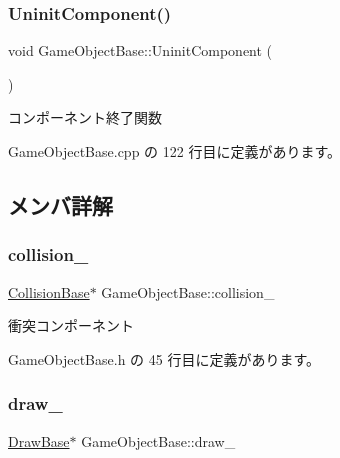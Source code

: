 \subsubsection{\texorpdfstring{Uninit\+Component()}{UninitComponent()}}
{\footnotesize\ttfamily void Game\+Object\+Base\+::\+Uninit\+Component (\begin{DoxyParamCaption}{ }\end{DoxyParamCaption})\hspace{0.3cm}{\ttfamily [private]}}



コンポーネント終了関数 



 Game\+Object\+Base.\+cpp の 122 行目に定義があります。



\subsection{メンバ詳解}
\mbox{\label{class_game_object_base_a63c44924e1e0c90461d191fdb11f33b0}} 
\subsubsection{\texorpdfstring{collision\+\_\+}{collision\_}}
{\footnotesize\ttfamily \mbox{\hyperlink{class_collision_base}{Collision\+Base}}$\ast$ Game\+Object\+Base\+::collision\+\_\+\hspace{0.3cm}{\ttfamily [private]}}



衝突コンポーネント 



 Game\+Object\+Base.\+h の 45 行目に定義があります。

\mbox{\label{class_game_object_base_af98b5356a668abe576a0d20a37f26e03}} 
\subsubsection{\texorpdfstring{draw\+\_\+}{draw\_}}
{\footnotesize\ttfamily \mbox{\hyperlink{class_draw_base}{Draw\+Base}}$\ast$ Game\+Object\+Base\+::draw\+\_\+\hspace{0.3cm}{\ttfamily [private]}}



